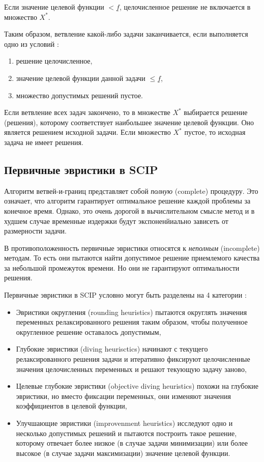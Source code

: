 \documentclass[%
	11pt,
	a4paper,
	utf8,
		]{article}
\begin{document}
Если значение целевой функции $ < \underline{f} $, целочисленное решение не включается в множество $ X^* $.

Таким образом, ветвление какой-либо задачи заканчивается, если выполняется одно из условий \cite{panteleev}:
\begin{enumerate}
	\item решение целочисленное,
	
	\item значение целевой функции данной задачи $ \leqslant \underline{f} $,
	
	\item множество допустимых решений пустое.
\end{enumerate}

Если ветвление всех задач закончено, то в множестве $ X^* $ выбирается решение (решения), которому соответствует наибольшее значение целевой функции. Оно является решением исходной задачи. Если множество $ X^* $ пустое, то исходная задача не имеет решения.

\subsection{Первичные эвристики в SCIP}

Алгоритм ветвей-и-границ представляет собой \emph{полную} (complete) процедуру. Это означает, что алгоритм гарантирует оптимальное решение каждой проблемы за конечное время. Однако, это очень дорогой в вычислительном смысле метод и в худшем случае временные издержки будут экспоненйиально зависеть от размерности задачи.

В противоположенность первичные эвристики относятся к \emph{неполным} (incomplete) методам. То есть они пытаются найти допустимое решение приемлемого качества за небольшой промежуток времени. Но они не гарантируют оптимальности решения.

Первичные эвристики в SCIP условно могут быть разделены на 4 категории \cite{achterberg:constr_int_prog}:
\begin{itemize}
	\item Эвристики округления (rounding heuristics) пытаются округлять значения переменных релаксированного решения таким образом, чтобы полученное округленное решение оставалось допустимым,
	
	\item Глубокие эвристики (diving heurisctics) начинают с текущего релаксированного решения задачи и итеративно фиксируют целочисленные значения целочисленных переменных и решают текующую задачу заново,
	
	\item Целевые глубокие эвристики (objective diving heuristics) похожи на глубокие эвристики, но вместо фиксации переменных, они изменяют значения коэффициентов в целевой функции,
	
	\item Улучшающие эвристики (improvenment heuristics) исследуют одно и несколько допустимых решений и пытаются построить такое решение, которому отвечает более низкое (в случае задачи минимизации) или более высокое (в случае задачи максимизации) значение целевой функции.
\end{itemize}
\end{document}
